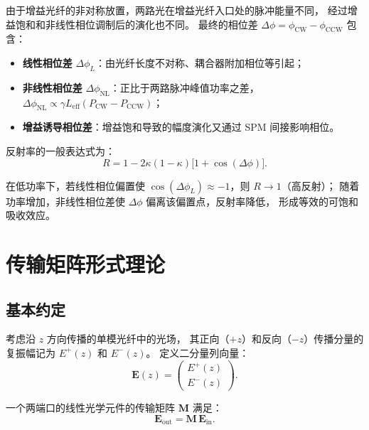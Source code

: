 \documentclass[11pt,a4paper]{ctexart}
\begin{document}
由于增益光纤的非对称放置，两路光在增益光纤入口处的脉冲能量不同，
经过增益饱和和非线性相位调制后的演化也不同。
最终的相位差 $\Delta\phi = \phi_{\text{CW}} - \phi_{\text{CCW}}$ 包含：

\begin{itemize}
  \item \textbf{线性相位差} $\Delta\phi_L$：由光纤长度不对称、耦合器附加相位等引起；
  \item \textbf{非线性相位差} $\Delta\phi_{\text{NL}}$：正比于两路脉冲峰值功率之差，
        $\Delta\phi_{\text{NL}} \propto \gamma L_{\text{eff}} (P_{\text{CW}} - P_{\text{CCW}})$；
  \item \textbf{增益诱导相位差}：增益饱和导致的幅度演化又通过 SPM 间接影响相位。
\end{itemize}

反射率的一般表达式为\cite{doran1988nonlinear}：
\begin{equation}
  R = 1 - 2\kappa(1-\kappa)\bigl[1 + \cos(\Delta\phi)\bigr].
  \label{eq:nalm_reflectivity}
\end{equation}

在低功率下，若线性相位偏置使 $\cos(\Delta\phi_L) \approx -1$，则 $R \to 1$（高反射）；
随着功率增加，非线性相位差使 $\Delta\phi$ 偏离该偏置点，反射率降低，
形成等效的可饱和吸收效应。

\section{传输矩阵形式理论}
\label{sec:matrices}

\subsection{基本约定}

考虑沿 $z$ 方向传播的单模光纤中的光场，
其正向（$+z$）和反向（$-z$）传播分量的复振幅记为 $E^+(z)$ 和 $E^-(z)$。
定义二分量列向量：
\begin{equation}
  \mathbf{E}(z) = \begin{pmatrix} E^+(z) \\ E^-(z) \end{pmatrix}.
  \label{eq:field_vector}
\end{equation}

一个两端口的线性光学元件的传输矩阵 $\mathbf{M}$ 满足：
\begin{equation}
  \mathbf{E}_{\text{out}} = \mathbf{M}\, \mathbf{E}_{\text{in}}.
  \label{eq:transfer_relation}
\end{equation}
\end{document}
